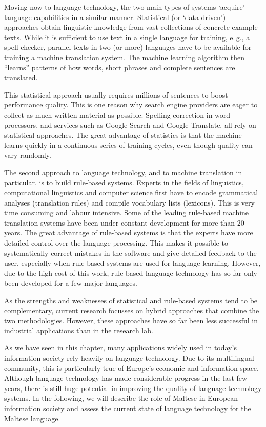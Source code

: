 \begin{multicols}{2}
Moving now to language technology, the two main types of systems ‘acquire’ language capabilities in a similar manner. Statistical (or ‘data-driven’) approaches obtain linguistic knowledge from vast collections of concrete example texts. While it is sufficient to use text in a single language for training, e.\,g., a spell checker, parallel texts in two (or more) languages have to be available for training a machine translation system. The machine learning algorithm then “learns” patterns of how words, short phrases and complete sentences are translated. 

This statistical approach usually requires millions of sentences to boost performance quality. This is one reason why search engine providers are eager to collect as much written material as possible. Spelling correction in word processors, and services such as Google Search and Google Translate, all rely on statistical approaches. The great advantage of statistics is that the machine learns quickly in a continuous series of training cycles, even though quality can vary randomly.

The second approach to language technology, and to machine translation in particular, is to build rule-based systems. Experts in the fields of linguistics, computational linguistics and computer science first have to encode grammatical analyses (translation rules) and compile vocabulary lists (lexicons). This is very time consuming and labour intensive. Some of the leading rule-based machine translation systems have been under constant development for more than 20 years. The great advantage of rule-based systems is that the experts have more detailed control over the language processing. This makes it possible to systematically correct mistakes in the software and give detailed feedback to the user, especially when rule-based systems are used for language learning. However, due to the high cost of this work, rule-based language technology has so far only been developed for a few major languages. 


As the strengths and weaknesses of statistical and rule-based systems tend to be complementary, current research focusses on hybrid approaches that combine the two methodologies. However, these approaches have so far been less successful in industrial applications than in the research lab. 

As we have seen in this chapter, many applications widely used in today’s information society rely heavily on language technology. Due to its multilingual community, this is particularly true of Europe’s economic and information space. Although language technology has made considerable progress in the last few years, there is still huge potential in improving the quality of language technology systems. In the following, we will describe the role of Maltese in European information society and assess the current state of language technology for the Maltese language.

\end{multicols}

